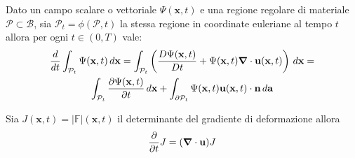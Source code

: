 \begin{theorem}
Dato un campo scalare o vettoriale $\Psi(\mathbf{x},t)$ e una regione regolare di materiale $\mathcal{P}\subset\mathcal{B}$, sia $\mathcal{P}_{t} = \phi(\mathcal{P},t)$ la stessa regione in coordinate euleriane al tempo $t$ allora per ogni $t\in (0,T)$ vale:
\begin{multline}
\frac{d}{dt}\int_{\mathcal{P}_{t}}\Psi(\mathbf{x},t)\,d\mathbf{x} =
 \int_{\mathcal{P}_{t}}\left(\frac{D\Psi(\mathbf{x},t)}{Dt}+\Psi(\mathbf{x},t)\boldsymbol{\nabla}\cdot\mathbf{u}(\mathbf{x},t)\right)\,d\mathbf{x} = \\
\int_{\mathcal{P}_{t}}\frac{\partial\Psi(\mathbf{x},t)}{\partial t}\,d\mathbf{x}+ \int_{\partial\mathcal{P}_{t}}\Psi(\mathbf{x},t)\mathbf{u}(\mathbf{x},t)\cdot\mathbf{n}\,d\mathbf{a}
\end{multline}
\end{theorem}
\begin{lemma}
Sia $J(\mathbf{x},t)=|\mathbb{F}|(\mathbf{x},t)$ il determinante del gradiente di deformazione allora
\begin{equation}
\frac{\partial}{\partial t}J = (\boldsymbol{\nabla} \cdot \mathbf{u})J
\end{equation}
\end{lemma}
